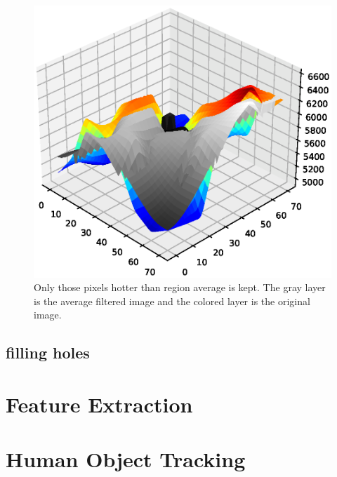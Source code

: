 \begin{figure}
  \centering
  \includegraphics[width=\textwidth]{figures/detect_filterthres.eps}
  \caption{Only those pixels hotter than region average is kept. The gray layer is the average filtered image and the colored layer is the original image.}\label{fig:detection3d}
\end{figure}


\subsection{filling holes}
\section{Feature Extraction}
\section{Human Object Tracking}